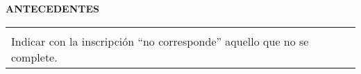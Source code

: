 \documentclass{article}
\newcommand{\titulosec}[1]{\textbf{\textsf{\MakeUppercase{#1}}}}
\newcommand{\seccion}[1]{
  \bigskip
  \noindent \titulosec{#1} \\
  \noindent\rule{\textwidth}{1pt}
}
\newcommand{\recuadro}[1]{
  \begin{center}
  \begin{tabular}{|m{0.9\textwidth}|}
      \hline
      \begin{center}
      \textsf{\textbf{#1}}
      \end{center}
      \\
      \hline
  \end{tabular}
  \end{center}
}
\newcommand{\enlace}[2]{\href{#1}{\textcolor{blue}{\underline{#2}}}}
\begin{document}






\noindent \titulosec{Antecedentes}

\recuadro{En todos los casos ordenar los antecedentes cronológicamente, poniendo primero los más recientes.\\Indicar con la inscripción “no corresponde” aquello que no se complete.}
\end{document}

